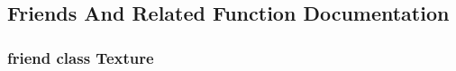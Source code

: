 \subsection{Friends And Related Function Documentation}
\hypertarget{class_agmd_1_1_texture_base_af7f909106d08e36cd50aa58e36f9bf47}{
\subsubsection[{Texture}]{\setlength{\rightskip}{0pt plus 5cm}friend class {\bf Texture}\hspace{0.3cm}{\ttfamily [friend]}}}\label{class_agmd_1_1_texture_base_af7f909106d08e36cd50aa58e36f9bf47}


